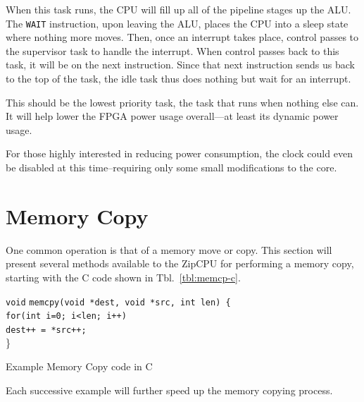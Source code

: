 \documentclass{gqtekspec}
\begin{document}
When this task runs, the CPU will fill up all of the pipeline stages up the
ALU.  The {\tt WAIT} instruction, upon leaving the ALU, places the CPU into
a sleep state where nothing more moves.  Then, once an interrupt takes place,
control passes to the supervisor task to handle the interrupt.  When control
passes back to this task, it will be on the next instruction.  Since that next
instruction sends us back to the top of the task, the idle task thus does
nothing but wait for an interrupt.

This should be the lowest priority task, the task that runs when nothing else
can.  It will help lower the FPGA power usage overall---at least its dynamic
power usage.

For those highly interested in reducing power consumption, the clock could
even be disabled at this time--requiring only some small modifications to the
core.

\section{Memory Copy}
One common operation is that of a memory move or copy.  This section will
present several methods available to the ZipCPU for performing a memory
copy, starting with the C code shown in Tbl.~\ref{tbl:memcp-c}.
\begin{table}\begin{center}
\parbox{4in}{\begin{tabbing}
{\tt void} \= {\tt memcpy(void *dest, void *src, int len) \{} \\
	\> {\tt for(int i=0; i<len; i++)} \\
	\> \hspace{0.2in} {\tt *dest++ = *src++;} \\
\}
\end{tabbing}}
\caption{Example Memory Copy code in C}\label{tbl:memcp-c}
\end{center}\end{table}
Each successive example will further speed up the memory copying process.
\end{document}
